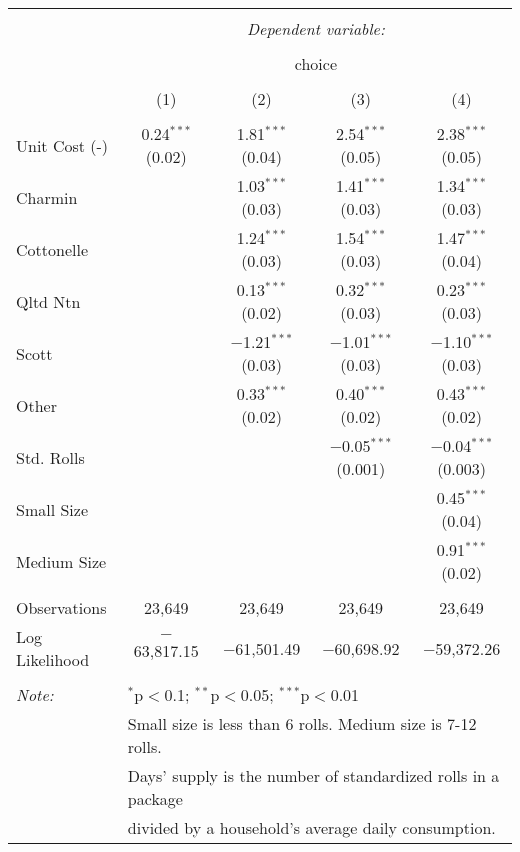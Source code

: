 
\begin{table}[!htbp] \centering 
  \caption{} 
  \label{tab:mnlDallasBaseline} 
\begin{tabular}{@{\extracolsep{5pt}}lcccc} 
\\[-1.8ex]\hline 
\hline \\[-1.8ex] 
 & \multicolumn{4}{c}{\textit{Dependent variable:}} \\ 
\cline{2-5} 
\\[-1.8ex] & \multicolumn{4}{c}{choice} \\ 
\\[-1.8ex] & (1) & (2) & (3) & (4)\\ 
\hline \\[-1.8ex] 
 Unit Cost (-) & 0.24$^{***}$ (0.02) & 1.81$^{***}$ (0.04) & 2.54$^{***}$ (0.05) & 2.38$^{***}$ (0.05) \\ 
  Charmin &  & 1.03$^{***}$ (0.03) & 1.41$^{***}$ (0.03) & 1.34$^{***}$ (0.03) \\ 
  Cottonelle &  & 1.24$^{***}$ (0.03) & 1.54$^{***}$ (0.03) & 1.47$^{***}$ (0.04) \\ 
  Qltd Ntn &  & 0.13$^{***}$ (0.02) & 0.32$^{***}$ (0.03) & 0.23$^{***}$ (0.03) \\ 
  Scott &  & $-$1.21$^{***}$ (0.03) & $-$1.01$^{***}$ (0.03) & $-$1.10$^{***}$ (0.03) \\ 
  Other &  & 0.33$^{***}$ (0.02) & 0.40$^{***}$ (0.02) & 0.43$^{***}$ (0.02) \\ 
  Std. Rolls &  &  & $-$0.05$^{***}$ (0.001) & $-$0.04$^{***}$ (0.003) \\ 
  Small Size &  &  &  & 0.45$^{***}$ (0.04) \\ 
  Medium Size &  &  &  & 0.91$^{***}$ (0.02) \\ 
 \hline \\[-1.8ex] 
Observations & 23,649 & 23,649 & 23,649 & 23,649 \\ 
Log Likelihood & $-$63,817.15 & $-$61,501.49 & $-$60,698.92 & $-$59,372.26 \\ 
\hline 
\hline \\[-1.8ex] 
\textit{Note:}  & \multicolumn{4}{l}{$^{*}$p$<$0.1; $^{**}$p$<$0.05; $^{***}$p$<$0.01} \\ 
 & \multicolumn{4}{l}{Small size is less than 6 rolls. Medium size is 7-12 rolls. } \\ 
 & \multicolumn{4}{l}{Days' supply is the number of standardized rolls in a package} \\ 
 & \multicolumn{4}{l}{divided by a household's average daily consumption.} \\ 
\end{tabular} 
\end{table} 
